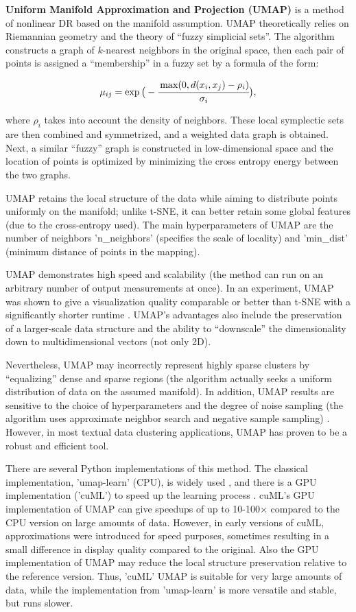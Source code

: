 \textbf{Uniform Manifold Approximation and Projection (UMAP)} is a method of nonlinear DR
based on the manifold assumption. UMAP theoretically relies on Riemannian geometry and the theory
of “fuzzy simplicial sets”. The algorithm constructs a graph of $k$-nearest neighbors
in the original space, then each pair of points is assigned a “membership” in a fuzzy set by a formula of the form:

\begin{equation}
    \mu_{ij}=\exp\big(-\cfrac{\max(0, d(x_i, x_j) - \rho_i)}{\sigma_i}\big),
\end{equation}

where $\rho_i$ takes into account the density of neighbors. These local symplectic sets are then combined
and symmetrized, and a weighted data graph is obtained. Next, a similar “fuzzy” graph is constructed in
low-dimensional space and the location of points is optimized by minimizing the cross entropy energy between
the two graphs.

UMAP retains the local structure of the data while aiming to distribute points uniformly on the manifold;
unlike t-SNE, it can better retain some global features (due to the cross-entropy used). The main hyperparameters
of UMAP are the number of neighbors 'n\_neighbors' (specifies the scale of locality) and 'min\_dist'
(minimum distance of points in the mapping).

UMAP demonstrates high speed and scalability (the method can run on an arbitrary number of output measurements
at once). In an experiment, UMAP was shown to give a visualization quality comparable or better than t-SNE
with a significantly shorter runtime \parencite{UMAP2018mcinnes}. UMAP's advantages also include the preservation
of a larger-scale data structure and the ability to “downscale” the dimensionality down to multidimensional
vectors (not only 2D).

Nevertheless, UMAP may incorrectly represent highly sparse clusters by “equalizing” dense and sparse regions
(the algorithm actually seeks a uniform distribution of data on the assumed manifold). In addition, UMAP
results are sensitive to the choice of hyperparameters and the degree of noise sampling (the algorithm uses
approximate neighbor search and negative sample sampling) \parencite{huang2022towards}. However, in most textual
data clustering applications, UMAP has proven to be a robust and efficient tool.

There are several Python implementations of this method. The classical implementation, 'umap-learn' (CPU),
is widely used \parencite{mcinnes2018umap-software}, and there is a GPU implementation ('cuML') to speed
up the learning process \parencite{cuml2020machine}. cuML's GPU implementation of UMAP can give speedups
of up to 10-100× compared to the CPU version on large amounts of data. However, in early versions of cuML,
approximations were introduced for speed purposes, sometimes resulting in a small difference in display
quality compared to the original. Also the GPU implementation of UMAP may reduce the local structure preservation
relative to the reference version. Thus, 'cuML' UMAP is suitable for very large amounts of data, while
the implementation from 'umap-learn' is more versatile and stable, but runs slower.

